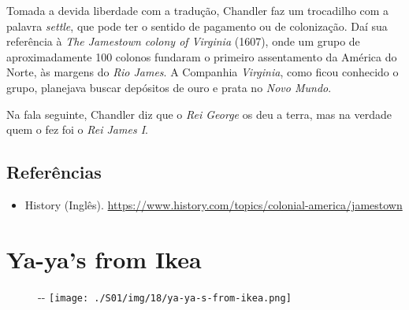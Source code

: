 Tomada a devida liberdade com a tradução, Chandler faz um trocadilho com
a palavra \emph{settle}, que pode ter o sentido de pagamento ou de
colonização. Daí sua referência à \emph{The Jamestown colony of
Virginia} (1607), onde um grupo de aproximadamente 100 colonos fundaram
o primeiro assentamento da América do Norte, às margens do \emph{Rio
James}. A Companhia \emph{Virginia}, como ficou conhecido o grupo,
planejava buscar depósitos de ouro e prata no \emph{Novo Mundo}.

Na fala seguinte, Chandler diz que o \emph{Rei George} os deu a terra,
mas na verdade quem o fez foi o \emph{Rei James I}.

\hypertarget{referuxeancias-4}{%
\subsection{Referências}\label{referuxeancias-4}}

\begin{itemize}
\tightlist
\item
  \sloppy History (Inglês). \url{https://www.history.com/topics/colonial-america/jamestown}
\end{itemize}

\hypertarget{ya-yas-from-ikea}{%
\section{Ya-ya's from Ikea}\label{ya-yas-from-ikea}}

\begin{figure}[!ht]
  \begin{adjustwidth}{-\oddsidemargin-1in}{-\rightmargin}
    \centering
    \texttt{[image: ./S01/img/18/ya-ya-s-from-ikea.png]}
  \end{adjustwidth}
\end{figure}


